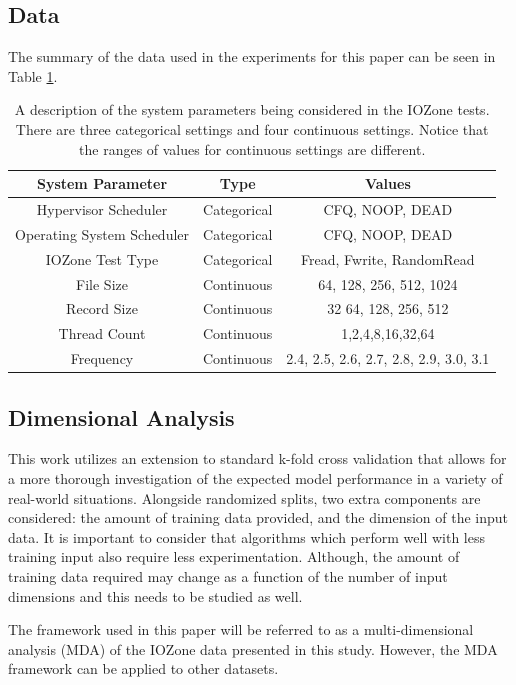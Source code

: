 \documentclass{scspaperproc}
\theoremstyle{scsthe}
\begin{document}
\subsection{Data}
The summary of the data used in the experiments for this paper can be
seen in Table \ref{tab:data_type}.

\begin{table}
  \centering
  \begin{tabular}{|c|c|c|}
    \hline
    \textbf{System Parameter} & \textbf{Type} & \textbf{Values}\\
    \hline
    Hypervisor Scheduler & Categorical & CFQ, NOOP, DEAD\\
    Operating System Scheduler & Categorical & CFQ, NOOP, DEAD\\
    IOZone Test Type & Categorical & Fread, Fwrite, RandomRead\\
    File Size & Continuous & 64, 128, 256, 512, 1024\\
    Record Size & Continuous & 32 64, 128, 256, 512\\
    Thread Count & Continuous & 1,2,4,8,16,32,64\\
    Frequency & Continuous & 2.4, 2.5, 2.6, 2.7, 2.8, 2.9, 3.0, 3.1\\
    \hline
  \end{tabular}
  \caption{A description of the system parameters being considered in
    the IOZone tests. There are three categorical settings and four
    continuous settings. Notice that the ranges of values for
    continuous settings are different.}
  \label{tab:data_type}
\end{table}

\subsection{Dimensional Analysis}
This work utilizes an extension to standard k-fold cross validation
that allows for a more thorough investigation of the expected model
performance in a variety of real-world situations. Alongside
randomized splits, two extra components are considered: the amount of
training data provided, and the dimension of the input data. It is
important to consider that algorithms which perform well with less
training input also require less experimentation. Although, the amount
of training data required may change as a function of the number of
input dimensions and this needs to be studied as well.

The framework used in this paper will be referred to as a
multi-dimensional analysis (MDA) of the IOZone data presented in this
study. However, the MDA framework can be applied to other datasets.
\end{document}
